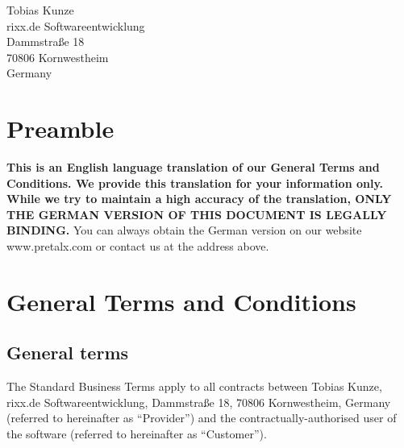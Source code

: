 \documentclass{terms}
\begin{document}
\maketitle

\begin{center}
Tobias Kunze\\
rixx.de Softwareentwicklung\\
Dammstraße 18\\
70806 Kornwestheim\\
Germany
\end{center}
\sloppy

\section*{Preamble}

\textbf{This is an English language translation of our General Terms and Conditions.
We provide this translation for your information only.
While we try to maintain a high accuracy of the translation, ONLY THE GERMAN VERSION OF THIS DOCUMENT IS LEGALLY BINDING.}
You can always obtain the German version on our website www.pretalx.com or contact us at the address above.

\section{General Terms and Conditions}
\subsection{General terms}
The Standard Business Terms apply to all contracts between Tobias Kunze, rixx.de Softwareentwicklung, Dammstraße 18, 70806 Kornwestheim, Germany (referred to hereinafter as “Provider”) and the contractually-authorised user of the software (referred to hereinafter as “Customer”).
\end{document}

